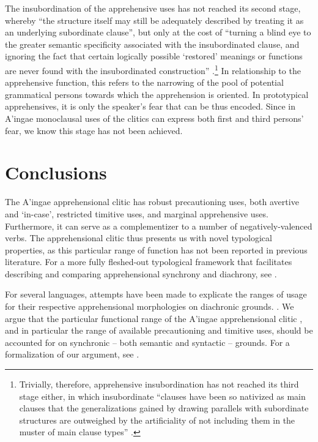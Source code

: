 \documentclass[output=paper,colorlinks,citecolor=brown]{langscibook}
\begin{document}
The insubordination of the apprehensive uses has not reached its second stage, whereby ``the structure itself may still be adequately described by treating it as an underlying subordinate clause'', but only at the cost of ``turning a blind eye to the greater semantic specificity associated with the insubordinated clause, and ignoring the fact that certain logically possible `restored' meanings or functions are never found with the insubordinated construction'' \citep[430--431]{evans2007insubordination}.\footnote{Trivially, therefore, apprehensive insubordination has not reached its third stage either, in which insubordinate ``clauses have been so nativized as main clauses that the generalizations gained by drawing parallels with subordinate structures are outweighed by the artificiality of not including them in the muster of main clause types'' \citep[431]{evans2007insubordination}.} In relationship to the apprehensive function, this refers to the narrowing of the pool of potential grammatical persons towards which the apprehension is oriented. In prototypical apprehensives, it is only the speaker's fear that can be thus encoded. Since in A'ingae monoclausal uses of the  clitics can express both first and third persons' fear, we know this stage has not been achieved.




\section{Conclusions}\label{sec:conclusions}

The A'ingae apprehensional clitic  has robust precautioning uses, both avertive and `in-case', restricted timitive uses, and marginal apprehensive uses. Furthermore, it can serve as a complementizer to a number of negatively-valenced verbs. The apprehensional clitic  thus presents us with novel typological properties, as this particular range of function has not been reported in previous literature.
For a more fully fleshed-out typological framework that facilitates describing and comparing apprehensional synchrony and diachrony, see \citet{anderbois-llc}.

For several languages, attempts have been made to explicate the ranges of usage for their respective apprehensional morphologies on diachronic grounds. \citep[among others,][]{lichtenberk1995apprehensional, dobrushina2017fear, wiemer2018major}. We argue that the particular functional range of the A'ingae apprehensional clitic , and in particular the range of available precautioning and timitive uses, should be accounted for on synchronic -- both semantic and syntactic -- grounds.
For a formalization of our argument, see \citet{dabkowski2024jos}.
\end{document}
